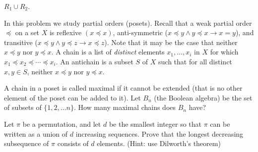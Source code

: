 \documentclass[12pt,twoside]{article}
\begin{document}
\begin{problem}{10}
$R_1 \cup R_2$.


\eparts

\end{problem}




\begin{problem}{20}
In this problem we study partial orders (posets). Recall that a weak partial order $\preceq$ on a set $X$ is reflexive $(x \preceq x)$, anti-symmetric ($x \preceq y \wedge y \preceq x \rightarrow x = y$), and transitive ($x \preceq y \wedge y \preceq z \rightarrow x \preceq z$). Note that it may be the case that neither $x \preceq y$ nor $y \preceq x$. A chain is a list of {\it distinct} elements $x_1, \ldots, x_i$ in $X$ for which $x_1 \preceq x_2 \preceq \cdots \preceq x_i$. An antichain is a subset $S$ of $X$ such that for all distinct $x, y \in S$, neither $x \preceq y$ nor $y \preceq x$. 

\bparts

  A chain in a poset is called maximal if it cannot be extended (that is no other element of the poset can be added to it).  Let $B_n$ (the Boolean algebra) be the set of subsets of $\{ 1, 2, \ldots n \} $.  How many maximal chains does $B_n$ have?

 Let $\pi$ be a permutation, and let $d$ be the smallest integer so that $\pi$ can be written as a union of $d$ increasing sequences.  Prove that the longest decreasing subsequence of $\pi$ consists of $d$ elements.  (Hint: use Dilworth's theorem) 

\eparts

\end{problem}



\end{document}
